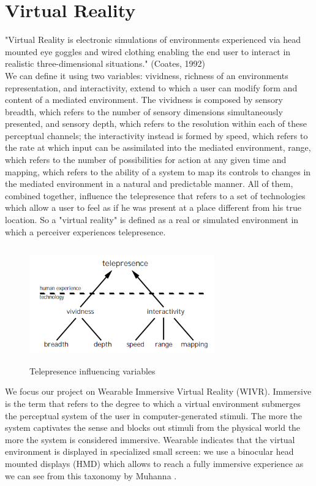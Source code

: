 \section{Virtual Reality}
"Virtual Reality is electronic simulations of environments experienced via head mounted eye goggles and wired clothing enabling the end user to interact in realistic three-dimensional situations." (Coates, 1992)\\
We can define it using two variables: vividness, richness of an environments representation, and interactivity, extend to which a user can modify form and content of a mediated environment. The vividness is composed by sensory breadth, which refers to the number of sensory dimensions simultaneously presented, and sensory depth, which refers to the resolution within each of these perceptual channels; the interactivity instead is formed by speed, which refers to the rate at which input can be assimilated into the mediated environment, range, which refers to the number of possibilities for action at any given time and mapping, which refers to the ability of a system to map its controls to changes in the mediated environment in a natural and predictable manner.\cite{StefanSeipel} All of them, combined together, influence the telepresence that refers to a set of technologies which allow a user to feel as if he was present at a place different from his true location. So a "virtual reality" is defined as a real or simulated environment in which a perceiver experiences telepresence.\cite{JonathanSteuer}\\
\begin{figure}[H]
\centering
\includegraphics[width=8cm, height=5cm]{immagini/telepresence.png}
\caption{Telepresence influencing variables}\label{fig:telepresence}
\end{figure}
We focus our project on Wearable Immersive Virtual Reality (WIVR). Immersive is the term that refers to the degree to which a virtual environment submerges the perceptual system of the user in computer-generated stimuli. The more the system captivates the sense and blocks out stimuli from the physical world the more the system is considered immersive.\cite{BioccaDelaney} Wearable indicates that the virtual environment is displayed in specialized small screen: we use a binocular head mounted displays (HMD) which allows to reach a fully immersive experience as we can see from this taxonomy by Muhanna \cite{Muhanna}.
